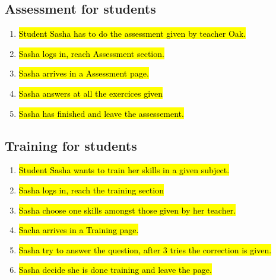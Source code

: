 \documentclass{article}
\begin{document}
    \subsection{Assessment for students}
    
        \begin{enumerate}
        
            \item \hl{Student Sasha has to do the assessment given by teacher Oak.}
            \item \hl{Sasha logs in, reach Assessment section.}
            \item \hl{Sasha arrives in a Assessment page.}
            \item \hl{Sasha answers at all the exercices given}
            \item \hl{Sasha has finished and leave the assessement.}
            
        
        \end{enumerate}
        
     \subsection{Training for students}
        \begin{enumerate}
            \item \hl{Student Sasha wants to train her skills in a given subject.}
            
            \item \hl{Sasha logs in, reach the training section}
            
            \item \hl{Sasha choose one skills amongst those given by her teacher.}
            
            \item \hl{Sacha arrives in a Training page.}
            
            \item \hl{Sasha try to answer the question, after 3 tries the correction is given.}
            
            \item \hl{Sasha decide she is done training and leave the page.}
        \end{enumerate}
\end{document}
